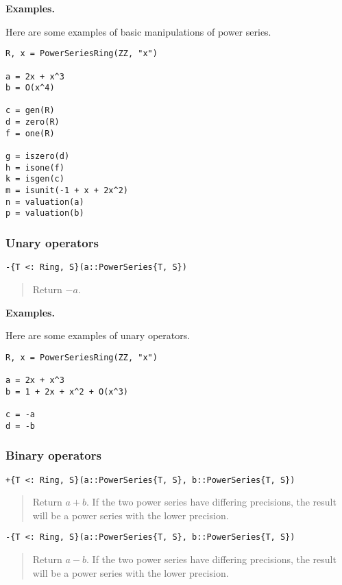 \documentclass[a4paper,10pt]{article}
\newcommand{\desc}[1]{\vspace{-3mm}\begin{quote}#1\end{quote}}
\begin{document}
{{\textbf{Examples.}

Here are some examples of basic manipulations of power series.

\begin{lstlisting}
R, x = PowerSeriesRing(ZZ, "x")

a = 2x + x^3
b = O(x^4)

c = gen(R)
d = zero(R)
f = one(R)

g = iszero(d)
h = isone(f)
k = isgen(c)
m = isunit(-1 + x + 2x^2)
n = valuation(a)
p = valuation(b)
\end{lstlisting}

\subsubsection{Unary operators}

\begin{lstlisting}
-{T <: Ring, S}(a::PowerSeries{T, S})
\end{lstlisting}

\desc{Return $-a$.}

\textbf{Examples.}

Here are some examples of unary operators.

\begin{lstlisting}
R, x = PowerSeriesRing(ZZ, "x")

a = 2x + x^3
b = 1 + 2x + x^2 + O(x^3)

c = -a
d = -b
\end{lstlisting}

\subsubsection{Binary operators}

\begin{lstlisting}
+{T <: Ring, S}(a::PowerSeries{T, S}, b::PowerSeries{T, S})
\end{lstlisting}

\desc{Return $a + b$. If the two power series have differing precisions, the
result will be a power series with the lower precision.}

\begin{lstlisting}
-{T <: Ring, S}(a::PowerSeries{T, S}, b::PowerSeries{T, S})
\end{lstlisting}

\desc{Return $a - b$. If the two power series have differing precisions, the
result will be a power series with the lower precision.}

}}
\end{document}

